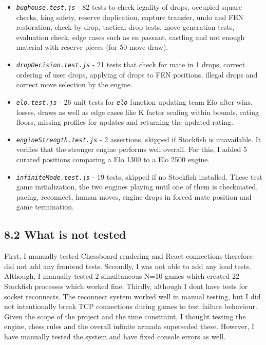 \documentclass[11pt,a4paper]{article}
\begin{document}
\begin{itemize}

\item \textit{\texttt{bughouse.test.js}} - 82 tests to check legality of drops, occupied square checks, king safety, reserve duplication, capture transfer, undo and FEN restoration, check by drop, tactical drop tests, move generation tests, evaluation check, edge cases such as en passant, castling and not enough material with reserve pieces (for 50 move draw).
\item \textit{\texttt{dropDecision.test.js}} - 21 tests that check for mate in 1 drops, correct ordering of user drops, applying of drops to FEN positions, illegal drops and correct move selection by the engine.
\item \textit{\texttt{elo.test.js}} - 26 unit tests for \textit{\texttt{elo}} function updating team Elo after wins, losses, draws as well as edge cases like K factor scaling within bounds, rating floors, missing profiles for updates and returning the updated rating.
\item \textit{\texttt{engineStrength.test.js}} - 2 assertions, skipped if Stockfish is unavailable. It verifies that the stronger engine performs well overall. For this, I added 5 curated positions comparing a Elo 1300 to a Elo 2500 engine.
\item \textit{\texttt{infiniteMode.test.js}} - 19 tests, skipped if no Stockfish installed. These test game initialization, the two engines playing until one of them is checkmated, pacing, reconnect, human moves, engine drops in forced mate position and game termination.

\end{itemize}

\subsection*{8.2 What is not tested}
First, I manually tested Chessboard rendering and React connections therefore did not add any frontend tests. Secondly, I was not able to add any load tests. Although, I manually tested 2 simultaneous N=10 games which created 22 Stockfish processes which worked fine. Thirdly, although I dont have tests for socket reconnects. The reconnect system worked well in manual testing, but I did not intentionally break TCP connections during games to test failure behaviour. Given the scope of the project and the time constraint, I thought testing the engine, chess rules and the overall infinite armada superseded these. However, I have manually tested the system and have fixed console errors as well.
\end{document}
